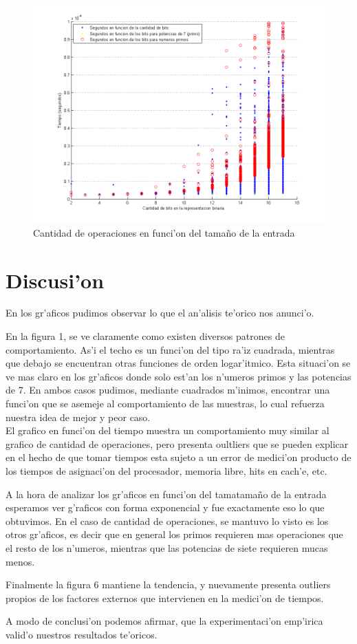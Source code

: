 \begin{figure}[H]
\centering
\includegraphics[scale=0.7]{../../codigo/ejercicio1/benchmark_de_tiempo/graficos/tamanio_Entrada_T/Tiempo_en_funcion_bits.png}
\caption{Cantidad de operaciones en funci'on del tama\~{n}o de la entrada}
\end{figure}

\section{Discusi'on}
En los gr'aficos pudimos observar lo que el an'alisis te'orico nos anunci'o.

En la figura 1, se ve claramente como existen diversos patrones de comportamiento. As'i el techo es un funci'on del tipo ra'iz 
cuadrada, mientras que debajo se encuentran otras funciones de orden logar'itmico. Esta situaci'on se ve mas claro en los 
gr'aficos donde solo est'an los n'umeros primos y las potencias de 7. En ambos casos pudimos, mediante cuadrados m'inimos, 
encontrar una funci'on que se asemeje al comportamiento de las muestras, lo cual refuerza nuestra idea de mejor y peor caso.\\
El grafico en funci'on del tiempo muestra un comportamiento muy similar al grafico de cantidad de operaciones, pero presenta 
oultliers que se pueden explicar en el hecho de que tomar tiempos esta sujeto a un error de medici'on producto de los tiempos 
de asignaci'on del procesador, memoria libre, hits en cach'e, etc.

A la hora de analizar los gr'aficos en funci'on del tamatama\~{n}o de la entrada esperamos ver g'raficos con forma exponencial y fue exactamente eso lo que obtuvimos. En el caso de cantidad de operaciones, se mantuvo lo visto es los otros gr'aficos, es decir que en general los primos requieren mas operaciones que el resto de los n'umeros, mientras que las potencias de siete requieren mucas menos.

Finalmente la figura 6 mantiene la tendencia, y nuevamente presenta outliers propios de los factores externos que intervienen 
en la medici'on de tiempos.

A modo de conclusi'on podemos afirmar, que la experimentaci'on emp'irica valid'o nuestros resultados te'oricos.
